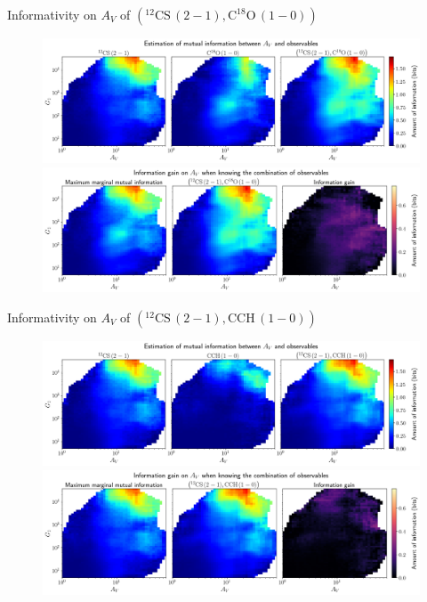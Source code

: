 \documentclass{beamer}
\begin{document}
\begin{frame}{Informativity on $A_V$ of $\left(\mathrm{^{12}CS\,(2-1)},\mathrm{C^{18}O\,(1-0)}\right)$}
    \begin{figure}
        \centering
        \includegraphics[width=0.95\linewidth]{../mi/av__12cs21_c18o10_mi.png}
        \vfill
        \includegraphics[width=0.95\linewidth]{../mi/av__12cs21_c18o10_mi_gain.png}
    \end{figure}
\end{frame}

\begin{frame}{Informativity on $A_V$ of $\left(\mathrm{^{12}CS\,(2-1)},\mathrm{CCH\,(1-0)}\right)$}
    \begin{figure}
        \centering
        \includegraphics[width=0.95\linewidth]{../mi/av__12cs21_cch10_mi.png}
        \vfill
        \includegraphics[width=0.95\linewidth]{../mi/av__12cs21_cch10_mi_gain.png}
    \end{figure}
\end{frame}
\end{document}
